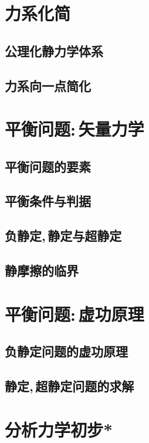 \section{力系化简}

\subsection{公理化静力学体系}

\subsection{力系向一点简化}

\section{平衡问题:\,矢量力学}

\subsection{平衡问题的要素}

\subsection{平衡条件与判据}

\subsection{负静定,\,静定与超静定}

\subsection{静摩擦的临界}

\section{平衡问题:\,虚功原理}

\subsection{负静定问题的虚功原理}

\subsection{静定,\,超静定问题的求解}

\section{分析力学初步*}

